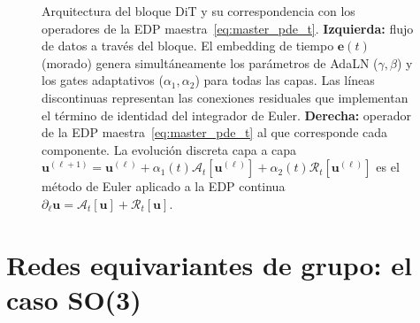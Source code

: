 \begin{figure}[t]

\caption{Arquitectura del bloque DiT y su correspondencia con los
operadores de la EDP maestra~\eqref{eq:master_pde_t}.
\textbf{Izquierda:} flujo de datos a través del bloque.
El embedding de tiempo $\bm{e}(t)$ (morado) genera simultáneamente
los parámetros de AdaLN ($\gamma, \beta$) y los gates adaptativos
($\alpha_1, \alpha_2$) para todas las capas.
Las líneas discontinuas representan las conexiones residuales
que implementan el término de identidad del integrador de Euler.
\textbf{Derecha:} operador de la EDP maestra~\eqref{eq:master_pde_t}
al que corresponde cada componente. La evolución discreta capa a capa
$\bm{u}^{(\ell+1)} = \bm{u}^{(\ell)}
+ \alpha_1(t)\mathcal{A}_t[\bm{u}^{(\ell)}]
+ \alpha_2(t)\mathcal{R}_t[\bm{u}^{(\ell)}]$
es el método de Euler aplicado a la EDP continua
$\partial_\ell \bm{u} = \mathcal{A}_t[\bm{u}] + \mathcal{R}_t[\bm{u}]$.}
\label{fig:dit_bloque}
\end{figure}

\section{Redes equivariantes de grupo: el caso SO(3)}
\label{sec:so3}

